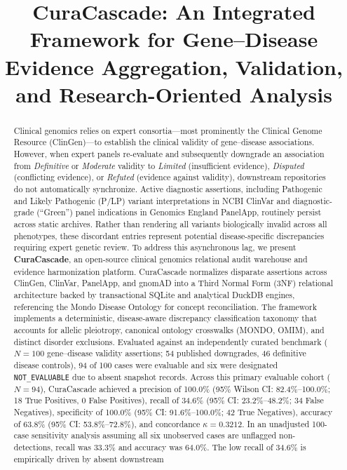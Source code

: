 \documentclass[conference]{IEEEtran}
\begin{document}
\title{CuraCascade: An Integrated Framework for Gene--Disease Evidence Aggregation, Validation, and Research-Oriented Analysis}

\author{
}

\maketitle

\begin{abstract}
Clinical genomics relies on expert consortia---most prominently the Clinical Genome Resource (ClinGen)---to establish the clinical validity of gene--disease associations. However, when expert panels re-evaluate and subsequently downgrade an association from \textit{Definitive} or \textit{Moderate} validity to \textit{Limited} (insufficient evidence), \textit{Disputed} (conflicting evidence), or \textit{Refuted} (evidence against validity), downstream repositories do not automatically synchronize. Active diagnostic assertions, including Pathogenic and Likely Pathogenic (P/LP) variant interpretations in NCBI ClinVar and diagnostic-grade (``Green'') panel indications in Genomics England PanelApp, routinely persist across static archives. Rather than rendering all variants biologically invalid across all phenotypes, these discordant entries represent potential disease-specific discrepancies requiring expert genetic review. To address this asynchronous lag, we present \textbf{CuraCascade}, an open-source clinical genomics relational audit warehouse and evidence harmonization platform. CuraCascade normalizes disparate assertions across ClinGen, ClinVar, PanelApp, and gnomAD into a Third Normal Form (3NF) relational architecture backed by transactional SQLite and analytical DuckDB engines, referencing the Mondo Disease Ontology for concept reconciliation. The framework implements a deterministic, disease-aware discrepancy classification taxonomy that accounts for allelic pleiotropy, canonical ontology crosswalks (MONDO, OMIM), and distinct disorder exclusions. Evaluated against an independently curated benchmark ($N = 100$ gene--disease validity assertions; 54 published downgrades, 46 definitive disease controls), 94 of 100 cases were evaluable and six were designated \texttt{NOT\_EVALUABLE} due to absent snapshot records. Across this primary evaluable cohort ($N = 94$), CuraCascade achieved a precision of 100.0\% (95\% Wilson CI: 82.4\%--100.0\%; 18 True Positives, 0 False Positives), recall of 34.6\% (95\% CI: 23.2\%--48.2\%; 34 False Negatives), specificity of 100.0\% (95\% CI: 91.6\%--100.0\%; 42 True Negatives), accuracy of 63.8\% (95\% CI: 53.8\%--72.8\%), and concordance $\kappa = 0.3212$. In an unadjusted 100-case sensitivity analysis assuming all six unobserved cases are unflagged non-detections, recall was 33.3\% and accuracy was 64.0\%. The low recall of 34.6\% is empirically driven by absent downstream 
\end{abstract}
\end{document}
